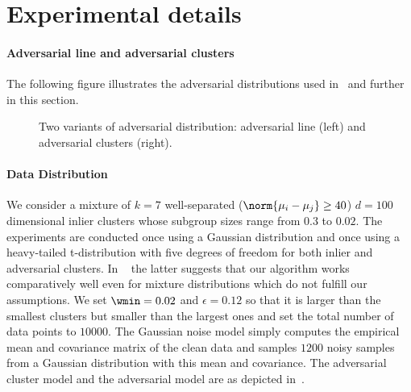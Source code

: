 \section{Experimental details}
\label{app:exp-details}

\paragraph{Adversarial line and adversarial clusters}
The following figure illustrates the adversarial distributions used in~ and further in this section.
\begin{figure}[htbp]
    \centering
    \centering
    
    
    \caption{Two variants of adversarial distribution: adversarial line (left) and adversarial clusters (right).}
    \label{fig:process_1}

\end{figure}


\paragraph{Data Distribution}
We consider a mixture of \(k = 7\) well-separated (\(\norm{\mu_i - \mu_j} \geq 40\)) \(d = 100\) dimensional inlier clusters whose subgroup sizes range from $0.3$ to $0.02$. The experiments are conducted once using a Gaussian distribution and once using a heavy-tailed t-distribution with five degrees of freedom for both inlier and adversarial clusters. In ~ the latter suggests that our algorithm works comparatively well even for mixture distributions which do not fulfill our assumptions. We set \(\wmin = 0.02\) and \(\epsilon=0.12\) so that it is larger than the smallest clusters but smaller than the largest ones and set the total number of data points to \(10000\). The Gaussian noise model simply computes the empirical mean and covariance matrix of the clean data and samples \(1200\) noisy samples from a Gaussian distribution with this mean and covariance. The adversarial cluster model and the adversarial model are as depicted in~.

